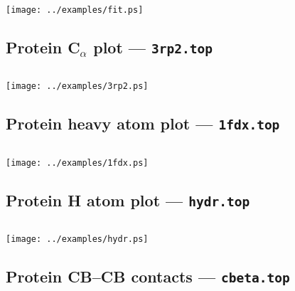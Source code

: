 \vspace{1cm}
\texttt{[image: ../examples/fit.ps]}

\newpage

\subsection{Protein C$_{\alpha}$ plot --- {\tt 3rp2.top}}

\vspace{1.0cm}

\begin{verbatim}

\end{verbatim}

\vspace{0.4cm}
\texttt{[image: ../examples/3rp2.ps]}

\newpage

\subsection{Protein heavy atom plot --- {\tt 1fdx.top}}

\vspace{0.4cm}

\begin{verbatim}

\end{verbatim}

\vspace{0.4cm}
\texttt{[image: ../examples/1fdx.ps]}

\newpage

\subsection{Protein H atom plot --- {\tt hydr.top}}

\vspace{0.4cm}

\begin{verbatim}

\end{verbatim}

\vspace{0.4cm}
\texttt{[image: ../examples/hydr.ps]}

\newpage

\subsection{Protein CB--CB contacts --- {\tt cbeta.top}}

